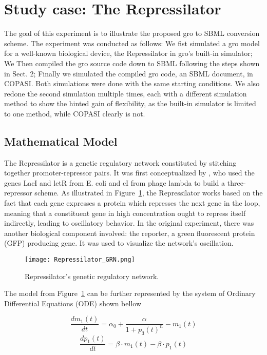 \documentclass[12pt]{article}
\begin{document}
\section{Study case: The Repressilator}


    The goal of this experiment is to illustrate the proposed gro to SBML conversion scheme. The experiment was conducted as follows: We fist simulated a gro model for a well-known biological device, the Repressilator in gro's built-in simulator; We Then compiled the gro source code down to SBML following the steps shown in Sect. 2; Finally we simulated the compiled gro code, an SBML document, in COPASI. Both simulations were done with the same starting conditions. We also redone the second simulation multiple times, each with a different simulation method to show the hinted gain of flexibility, as the built-in simulator is limited to one method, while COPASI clearly is not.


\subsection{Mathematical Model}

    The Repressilator is a genetic regulatory network constituted by stitching together promoter-repressor pairs. It was first conceptualized by \cite{Elowitz2000}, who used the genes LacI and letR from E. coli and cI from phage lambda to build a three-repressor scheme. As illustrated in Figure~\ref{fig:repressilator_model}, the Repressilator works based on the fact that each gene expresses a protein which represses the next gene in the loop, meaning that a constituent gene in high concentration ought to repress itself indirectly, leading to oscillatory behavior. In the original experiment, there was another biological component involved: the reporter, a green fluorescent protein (GFP) producing gene. It was used to visualize the network's oscillation.
    
    \begin{figure}[h]
        \centering
        \texttt{[image: Repressilator\_GRN.png]}
        \caption{Repressilator's genetic regulatory network.}
        \label{fig:repressilator_model}
    \end{figure}

    
    The model from Figure~\ref{fig:repressilator_model} can be further represented by the system of Ordinary Differential Equations (ODE) shown bellow
    
    \begin{multicols}{2}
        \begin{equation*}
            \frac{dm_{1}(t)}{dt} = \alpha_{0} + \frac{\alpha}{1 + p_{3}(t)^{n}} - m_{1}(t)
        \end{equation*}\break
        \begin{equation*}
            \frac{dp_{1}(t)}{dt} = \beta \cdot m_{1}(t) - \beta \cdot p_{1}(t)
        \end{equation*}
    \end{multicols}
    
\end{document}
